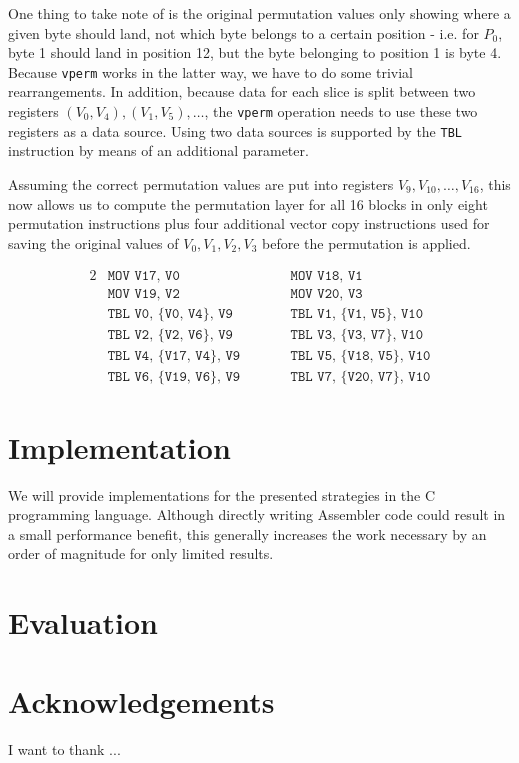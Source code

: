 \documentclass[12pt]{report}
\begin{document}
One thing to take note of is the original permutation values only showing where
a given byte should land, not which byte belongs to a certain position - i.e.
for $P_0$, byte 1 should land in position 12, but the byte belonging to
position 1 is byte 4. Because \texttt{vperm} works in the latter way, we have
to do some trivial rearrangements. In addition, because data for each slice is
split between two registers $(V_0,V_4),(V_1,V_5),\dots$, the \texttt{vperm}
operation needs to use these two registers as a data source. Using two data
sources is supported by the \texttt{TBL} instruction by means of an additional
parameter.

Assuming the correct permutation values are put into registers
$V_9,V_{10},\dots,V_{16}$, this now allows us to compute the permutation layer for
all 16 blocks in only eight permutation instructions plus four additional vector
copy instructions used for saving the original values of $V_0,V_1,V_2,V_3$
before the permutation is applied.

\begin{alignat*}{2}
    &\texttt{MOV V17, V0}\qquad &&\texttt{MOV V18, V1} \\
    &\texttt{MOV V19, V2}\qquad &&\texttt{MOV V20, V3} \\
    &\texttt{TBL V0, \{V0, V4\}, V9}\qquad &&\texttt{TBL V1, \{V1, V5\}, V10} \\
    &\texttt{TBL V2, \{V2, V6\}, V9}\qquad &&\texttt{TBL V3, \{V3, V7\}, V10} \\
    &\texttt{TBL V4, \{V17, V4\}, V9}\qquad &&\texttt{TBL V5, \{V18, V5\}, V10} \\
    &\texttt{TBL V6, \{V19, V6\}, V9}\qquad &&\texttt{TBL V7, \{V20, V7\}, V10}
\end{alignat*}

\chapter{Implementation}

We will provide implementations for the presented strategies in the C
programming language. Although directly writing Assembler code could result in
a small performance benefit, this generally increases the work necessary by an
order of magnitude for only limited results.

\chapter{Evaluation}

\chapter*{Acknowledgements}

I want to thank ...

\printbibliography
\end{document}
